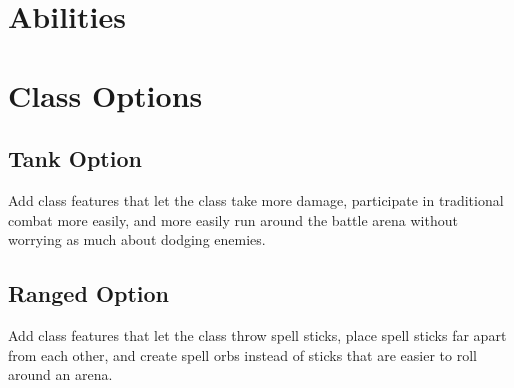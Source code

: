 \section{Abilities}

\section{Class Options}

\subsection{Tank Option}

Add class features that let the class take more damage, participate in traditional combat more easily, and more easily run around the battle arena without worrying as much about dodging enemies.

\subsection{Ranged Option}

Add class features that let the class throw spell sticks, place spell sticks far apart from each other, and create spell orbs instead of sticks that are easier to roll around an arena.